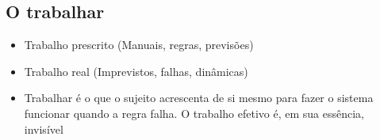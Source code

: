 \documentclass[12pt]{article}
\begin{document}
    \subsection{O trabalhar}
    \begin{itemize}
        \item Trabalho prescrito (Manuais, regras, previsões)
        \item Trabalho real (Imprevistos, falhas, dinâmicas)
        \item Trabalhar é o que o sujeito acrescenta de si mesmo para fazer o 
        sistema funcionar quando a regra falha. O trabalho efetivo é, em sua 
        essência, invisível
    \end{itemize}
\end{document}
